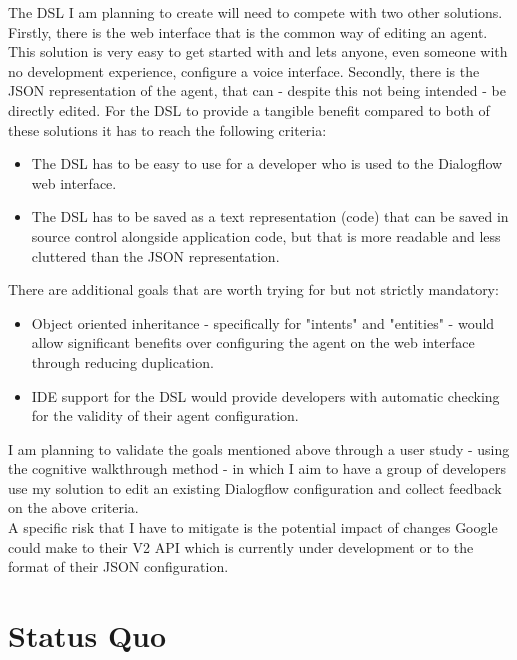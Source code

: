 The DSL I am planning to create will need to compete with two other solutions. \\
Firstly, there is the web interface that is the common way of editing an agent. This solution is very easy to get started with and lets anyone, even someone with no development experience, configure a voice interface.
Secondly, there is the JSON representation of the agent, that can - despite this not being intended - be directly edited.
For the DSL to provide a tangible benefit compared to both of these solutions it has to reach the following criteria:
\begin{itemize}
    \item The DSL has to be easy to use for a developer who is used to the Dialogflow web interface.
    \item The DSL has to be saved as a text representation (code) that can be saved in source control alongside application code, but that is more readable and less cluttered than the JSON representation.
\end{itemize}
There are additional goals that are worth trying for but not strictly mandatory:
\begin{itemize}
    \item Object oriented inheritance - specifically for "intents" and "entities" - would allow significant benefits over configuring the agent on the web interface through reducing duplication.
    \item IDE support for the DSL would provide developers with automatic checking for the validity of their agent configuration.
\end{itemize}

I am planning to validate the goals mentioned above through a user study - using the cognitive walkthrough method - in which I aim to have a group of developers use my solution to edit an existing Dialogflow configuration and collect feedback on the above criteria.\\
A specific risk that I have to mitigate is the potential impact of changes Google could make to their V2 API which is currently under development or to the format of their JSON configuration.

\chapter{Status Quo}
